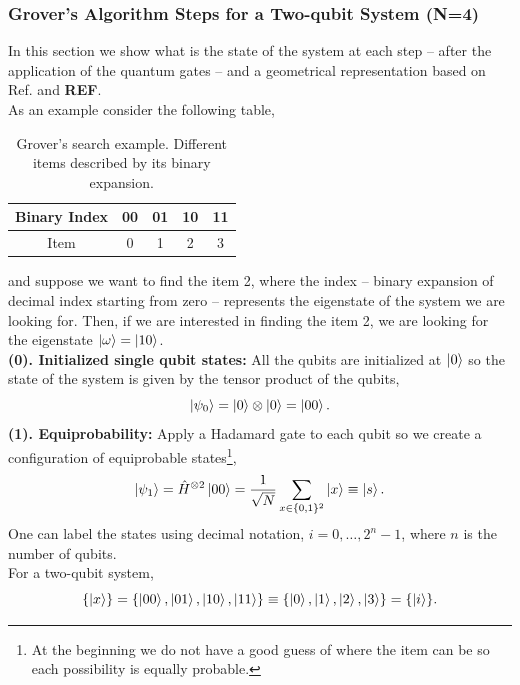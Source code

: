 \subsubsection{Grover's Algorithm Steps for a Two-qubit System (N=4)}
In this section we show what is the state of the system at each step -- after the application of the quantum gates -- and a geometrical representation based on Ref. \cite{Lavor2008Search} and \textbf{REF}.\\
As an example consider the following table,
\begin{table}[H]
\centering
\label{tab:GroverSearch}
\begin{tabular}{ | c | c | c | c | c | }
  \hline			
  Binary Index & 00 & 01 & 10 & 11 \\
    \hline		
  Item & 0 & 1 & 2 & 3 \\
  \hline  
\end{tabular}
\caption{Grover's search example. Different items described by its binary expansion.}
\end{table}
and suppose we want to find the item 2, where the index -- binary expansion of decimal index starting from zero -- represents the eigenstate of the system we are looking for. Then, if we are interested in finding the item 2, we are looking for the eigenstate $\ket{\omega} = \ket{10}$.\\
\textbf{(0). Initialized single qubit states:} All the qubits are initialized at $\ket{0}$ so the state of the system is given by the tensor product of the qubits,
\begin{equation}
    \ket{\psi_{0}} = \ket{0}\otimes \ket{0} = \ket{00}.
\end{equation}
\textbf{(1). Equiprobability:} Apply a Hadamard gate to each qubit so we create a configuration of equiprobable states\footnote{At the beginning we do not have a good guess of where the item can be so each possibility is equally probable.},
\begin{equation}
    \ket{\psi_{1}} = \hat{H}^{\otimes 2}\ket{00} = \frac{1}{\sqrt{N}}\sum_{x \in \{0,1\}^{2}}\ket{x} \equiv \ket{s}.
\end{equation}
 One can label the states using decimal notation, $i = 0 ,\ldots, 2^{n} -1$, where $n$ is the number of qubits.\\
For a two-qubit system,
\begin{equation}
   \{\ket{x}\} = \{\ket{00},\ket{01},\ket{10},\ket{11}\} \equiv \{\ket{0},\ket{1},\ket{2},\ket{3}\} = \{\ket{i}\}.
\end{equation}
